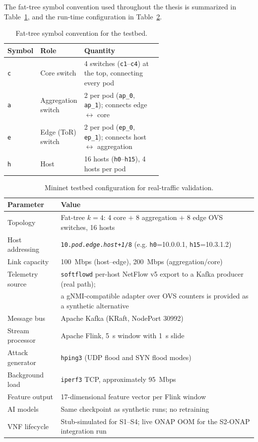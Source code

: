 The fat-tree symbol convention used throughout the thesis is summarized in
Table~\ref{tab:testbed-fat-tree-legend}, and the run-time configuration in
Table~\ref{tab:mininet-setup}.

\begin{table}[H]
\centering
\small
\caption{Fat-tree symbol convention for the testbed.}
\label{tab:testbed-fat-tree-legend}
\begin{tabular}{@{}llp{0.62\linewidth}@{}}
\toprule
Symbol & Role & Quantity \\
\midrule
\texttt{c}        & Core switch              & 4 switches (\texttt{c1}--\texttt{c4}) at the top, connecting every pod \\
\texttt{a}        & Aggregation switch       & 2 per pod (\texttt{ap\_0}, \texttt{ap\_1}); connects edge $\leftrightarrow$ core \\
\texttt{e}        & Edge (ToR) switch        & 2 per pod (\texttt{ep\_0}, \texttt{ep\_1}); connects host $\leftrightarrow$ aggregation \\
\texttt{h}        & Host                     & 16 hosts (\texttt{h0}--\texttt{h15}), 4 hosts per pod \\
\bottomrule
\end{tabular}
\end{table}

\begin{table}[H]
\centering
\small
\caption{Mininet testbed configuration for real-traffic validation.}
\label{tab:mininet-setup}
\begin{tabular}{@{}ll@{}}
\toprule
Parameter & Value \\
\midrule
Topology         & Fat-tree $k=4$: 4 core $+$ 8 aggregation $+$ 8 edge OVS switches, 16 hosts \\
Host addressing  & \texttt{10.\textit{pod}.\textit{edge}.\textit{host+1}/8} (e.g. \texttt{h0}=10.0.0.1, \texttt{h15}=10.3.1.2) \\
Link capacity    & 100~Mbps (host--edge), 200~Mbps (aggregation/core) \\
Telemetry source & \texttt{softflowd} per-host NetFlow v5 export to a Kafka producer (real path); \\
                 & a gNMI-compatible adapter over OVS counters is provided as a synthetic alternative \\
Message bus      & Apache Kafka (KRaft, NodePort 30992) \\
Stream processor & Apache Flink, 5~s window with 1~s slide \\
Attack generator & \texttt{hping3} (UDP flood and SYN flood modes) \\
Background load  & \texttt{iperf3} TCP, approximately 95~Mbps \\
Feature output   & 17-dimensional feature vector per Flink window \\
AI models        & Same checkpoint as synthetic runs; no retraining \\
VNF lifecycle    & Stub-simulated for S1--S4; live ONAP OOM for the S2-ONAP integration run \\
\bottomrule
\end{tabular}
\end{table}

